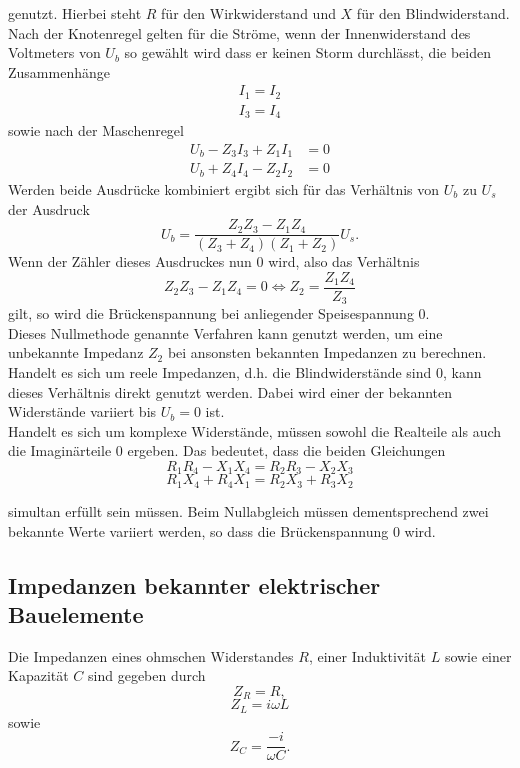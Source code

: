 genutzt.
Hierbei steht $R$ für den Wirkwiderstand und $X$ für den Blindwiderstand. \\
Nach der Knotenregel gelten für die Ströme, wenn der Innenwiderstand des Voltmeters von $U_b$ so gewählt wird dass er keinen Storm durchlässt, die beiden Zusammenhänge
\begin{gather}
  I_1 = I_2 \\
  I_3 = I_4
\end{gather}
sowie nach der Maschenregel
\begin{align}
  U_b - Z_3 I_3 + Z_1 I_1 &= 0 \\
  U_b + Z_4 I_4 - Z_2 I_2 &= 0
\end{align}
Werden beide Ausdrücke kombiniert ergibt sich für das Verhältnis von $U_b$ zu $U_s$ der Ausdruck
\begin{equation}
  U_b = \frac{Z_2 Z_3 - Z_1 Z_4}{(Z_3 + Z_4)(Z_1 + Z_2)}U_s.
\end{equation}
Wenn der Zähler dieses Ausdruckes nun 0 wird, also das Verhältnis
\begin{equation}
Z_2 Z_3 - Z_1 Z_4 = 0 \iff Z_2 = \frac{Z_1 Z_4}{Z_3} \label{eqn:1}
\end{equation}
gilt, so wird die Brückenspannung bei anliegender Speisespannung 0.\\
Dieses Nullmethode genannte Verfahren kann genutzt werden, um eine unbekannte Impedanz $Z_2$ bei ansonsten bekannten Impedanzen zu berechnen.
Handelt es sich um reele Impedanzen, d.h. die Blindwiderstände sind 0, kann dieses Verhältnis direkt genutzt werden.
Dabei wird einer der bekannten Widerstände variiert bis $U_b=0$ ist.\\
Handelt es sich um komplexe Widerstände, müssen sowohl die Realteile als auch die Imaginärteile 0 ergeben.
Das bedeutet, dass die beiden Gleichungen
\begin{equation}
  R_1 R_4 - X_1 X_4 = R_2 R_3 - X_2 X_3
  \label{eqn:bed1}
\end{equation}
\begin{equation}
  R_1 X_4 + R_4 X_1 = R_2 X_3 + R_3 X_2
  \label{eqn:bed2}
\end{equation}

simultan erfüllt sein müssen.
Beim Nullabgleich müssen dementsprechend zwei bekannte Werte variiert werden, so dass die Brückenspannung 0 wird.
\subsection{Impedanzen bekannter elektrischer Bauelemente}
Die Impedanzen eines ohmschen Widerstandes $R$, einer Induktivität $L$ sowie einer Kapazität $C$ sind gegeben durch
\begin{equation}
  Z_R = R,
\end{equation}
\begin{equation}
  Z_L = i \omega L
\end{equation}
sowie
\begin{equation}
  Z_C = \frac{-i}{\omega C}.
\end{equation}\cite{sample}
\newpage
